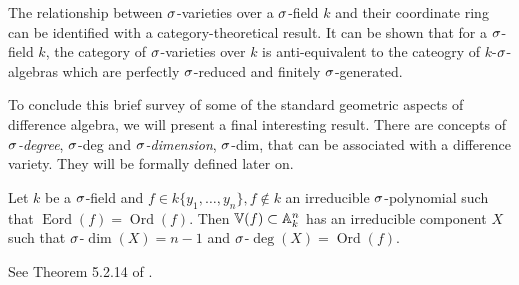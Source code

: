 The relationship between $\sigma$-varieties over a $\sigma$-field $k$ and their coordinate ring can be identified with a category-theoretical result.
It can be shown that for a $\sigma$-field $k$, the category of $\sigma$-varieties over $k$ is anti-equivalent to the cateogry of $k$-$\sigma$-algebras which are perfectly $\sigma$-reduced and finitely $\sigma$-generated.


To conclude this brief survey of some of the standard geometric aspects of difference algebra, we will present a final interesting result.
There are concepts of \emph{$\sigma$-degree}, $\sigma$-deg and \emph{$\sigma$-dimension}, $\sigma$-dim, that can be associated with a difference variety. They will be formally defined later on.
\begin{theorem}\label{irredcomp}
Let $k$ be a $\sigma$-field and $f \in k\{y_1,\ldots,y_n\}, f \notin k$ an irreducible $\sigma$-polynomial such that $\operatorname{Eord}(f) = \operatorname{Ord}(f)$. Then $\mathbb{V}(f) \subset \mathbb{A}_k^n$ has an irreducible component $X$ such that $\sigma$-$\dim(X) = n-1$ and $\sigma$-$\operatorname{deg}(X) = \operatorname{Ord}(f)$.
\begin{bew}
See Theorem 5.2.14 of \cite{wibmer}.
\end{bew}
\end{theorem}
